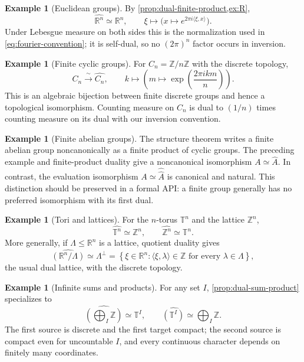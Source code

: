 \documentclass[11pt]{article}
\theoremstyle{definition}
\newtheorem{example}[theorem]{Example}
\theoremstyle{remark}
\newcommand{\T}{\mathbb T}
\newcommand{\R}{\mathbb R}
\newcommand{\Z}{\mathbb Z}
\newcommand{\dual}[1]{\widehat{#1}}
\newcommand{\bidual}[1]{\widehat{\widehat{#1}}}
\newcommand{\set}[1]{\left\{#1\right\}}
\begin{document}
\begin{example}[Euclidean groups]
\label{ex:Rn}
By \cref{prop:dual-finite-product,ex:R},
\[
 \dual{\R^n}\simeq\R^n,
 \qquad
 \xi\longmapsto\bigl(x\mapsto e^{2\pi i\langle\xi,x\rangle}\bigr).
\]
Under Lebesgue measure on both sides this is the normalization used in
\eqref{eq:fourier-convention}; it is self-dual, so no $(2\pi)^n$ factor occurs in
inversion.
\end{example}

\begin{example}[Finite cyclic groups]
\label{ex:finite-cyclic}
For $C_n=\Z/n\Z$ with the discrete topology,
\[
 C_n\xrightarrow{\ \sim\ }\dual{C_n},
 \qquad k\longmapsto
 \left(m\longmapsto\exp\left(\frac{2\pi i km}{n}\right)\right).
\]
This is an algebraic bijection between finite discrete groups and hence a topological
isomorphism.  Counting measure on $C_n$ is dual to $(1/n)$ times counting measure on its
dual with our inversion convention.
\end{example}

\begin{example}[Finite abelian groups]
\label{ex:finite}
The structure theorem writes a finite abelian group noncanonically as a finite product of
cyclic groups.  The preceding example and finite-product duality give a noncanonical
isomorphism $A\simeq\dual A$.  In contrast, the evaluation isomorphism
$A\simeq\bidual A$ is canonical and natural.  This distinction should be preserved in a
formal API: a finite group generally has no preferred isomorphism with its first dual.
\end{example}

\begin{example}[Tori and lattices]
For the $n$-torus $\T^n$ and the lattice $\Z^n$,
\[
  \dual{\T^n}\simeq\Z^n,
  \qquad \dual{\Z^n}\simeq\T^n.
\]
More generally, if $\Lambda\leq\R^n$ is a lattice, quotient duality gives
\[
  \dual{(\R^n/\Lambda)}\simeq
  \Lambda^\perp
  =\set{\xi\in\R^n:\langle\xi,\lambda\rangle\in\Z
      \text{ for every }\lambda\in\Lambda},
\]
the usual dual lattice, with the discrete topology.
\end{example}

\begin{example}[Infinite sums and products]
For any set $I$, \cref{prop:dual-sum-product} specializes to
\[
  \dual{\left(\bigoplus_I\Z\right)}\simeq\T^I,
  \qquad
  \dual{(\T^I)}\simeq\bigoplus_I\Z.
\]
The first source is discrete and the first target compact; the second source is compact
even for uncountable $I$, and every continuous character depends on finitely many
coordinates.
\end{example}
\end{document}
